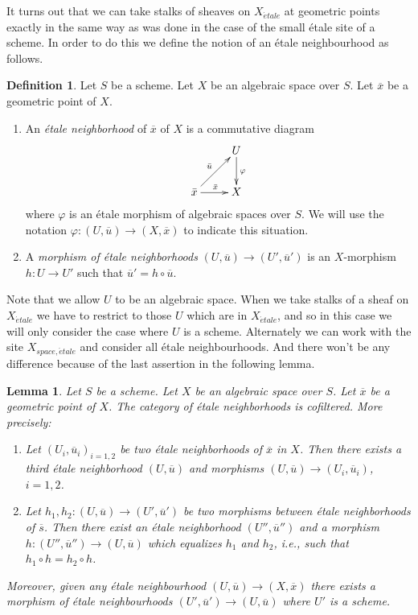\documentclass{stacks-project}
\theoremstyle{plain}
\newtheorem{lemma}[subsection]{Lemma}
\theoremstyle{definition}
\newtheorem{definition}[subsection]{Definition}
\theoremstyle{remark}
\numberwithin{equation}{subsection}
\def\etale{{\acute{e}tale}}
\begin{document}
\noindent
It turns out that we can take stalks of sheaves on $X_\etale$
at geometric points exactly in the same way as was done in the
case of the small \'etale site of a scheme. In order to do this we
define the notion of an \'etale neighbourhood as follows.

\begin{definition}
\label{definition-etale-neighbourhood}
Let $S$ be a scheme. Let $X$ be an algebraic space over $S$.
Let $\overline{x}$ be a geometric point of $X$.
\begin{enumerate}
\item An {\it \'etale neighborhood} of $\overline{x}$
of $X$ is a commutative diagram
$$
\xymatrix{
& U \ar[d]^\varphi \\
{\bar x} \ar[r]^{\bar x} \ar[ur]^{\bar u} & X
}
$$
where $\varphi$ is an \'etale morphism of algebraic spaces over $S$.
We will use the notation $\varphi : (U, \overline{u}) \to (X, \overline{x})$
to indicate this situation.
\item A {\it morphism of \'etale neighborhoods}
$(U, \overline{u}) \to (U', \overline{u}')$
is an $X$-morphism $h : U \to U'$
such that $\overline{u}' = h \circ \overline{u}$.
\end{enumerate}
\end{definition}

\noindent
Note that we allow $U$ to be an algebraic space. When we take stalks
of a sheaf on $X_\etale$ we have to restrict to those $U$ which
are in $X_\etale$, and so in this case we will only consider the case
where $U$ is a scheme. Alternately we can work with the site
$X_{space, \etale}$ and consider all \'etale neighbourhoods. And there
won't be any difference because of the last assertion in the following lemma.

\begin{lemma}
\label{lemma-cofinal-etale}
Let $S$ be a scheme. Let $X$ be an algebraic space over $S$.
Let $\overline{x}$ be a geometric point of $X$.
The category of \'etale neighborhoods is cofiltered. More precisely:
\begin{enumerate}
\item Let $(U_i, \overline{u}_i)_{i = 1, 2}$ be two \'etale neighborhoods of
$\overline{x}$ in $X$. Then there exists a third \'etale neighborhood
$(U, \overline{u})$ and morphisms
$(U, \overline{u}) \to (U_i, \overline{u}_i)$, $i = 1, 2$.
\item Let $h_1, h_2: (U, \overline{u}) \to (U', \overline{u}')$ be two
morphisms between \'etale neighborhoods of $\overline{s}$. Then there exist an
\'etale neighborhood $(U'', \overline{u}'')$ and a morphism
$h : (U'', \overline{u}'') \to (U, \overline{u})$
which equalizes $h_1$ and $h_2$, i.e., such that
$h_1 \circ h = h_2 \circ h$.
\end{enumerate}
Moreover, given any \'etale neighbourhood
$(U, \overline{u}) \to (X, \overline{x})$
there exists a morphism of \'etale neighbourhoods
$(U', \overline{u}') \to (U, \overline{u})$
where $U'$ is a scheme.
\end{lemma}
\end{document}

